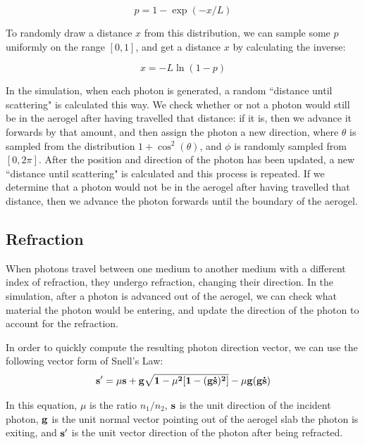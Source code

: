 \begin{equation}
p = 1 - \exp(-x/L)
    \label{eq:scatProb}
\end{equation}

To randomly draw a distance $x$ from this distribution, we can sample some $p$ uniformly on the range $[0,1]$, and get a distance $x$ by calculating the inverse:

\begin{equation}
x =   -L\ln(1-p)
  \label{eq:randomScat}
\end{equation}

In the simulation, when each photon is generated, a random ``distance until scattering" is calculated this way. 
We check whether or not a photon would still be in the aerogel after having travelled that distance: if it is, then we advance it forwards by that amount, and then assign the photon a new direction, where $\theta$ is sampled from the distribution $1 + \cos^2(\theta)$, and $\phi$ is randomly sampled from $[0, 2\pi]$.
After the position and direction of the photon has been updated, a new ``distance until scattering" is calculated and this process is repeated. 
If we determine that a photon would not be in the aerogel after having travelled that distance, then we advance the photon forwards until the boundary of the aerogel.

\subsection{Refraction}
When photons travel between one medium to another medium with a different index of refraction, they undergo refraction, changing their direction.
In the simulation, after a photon is advanced out of the aerogel, we can check what material the photon would be entering, and update the direction of the photon to account for the refraction.

In order to quickly compute the resulting photon direction vector, we can use the following vector form of Snell's Law: 
\begin{equation}
\bf{s'} = \mu\bf{s} + \bf{g}\sqrt{1 - \mu^2[1-(\bf{g \dot s})^2]} - \mu \bf{g}(\bf{g \dot s})
\label{eq:refract}
\end{equation}

In this equation, $\mu$ is the ratio $n_1/n_2$, $\bf{s}$ is the unit direction of the incident photon, $\bf{g}$ is the unit normal vector pointing out of the aerogel slab the photon is exiting, and $\bf{s'}$ is the unit vector direction of the photon after being refracted.

